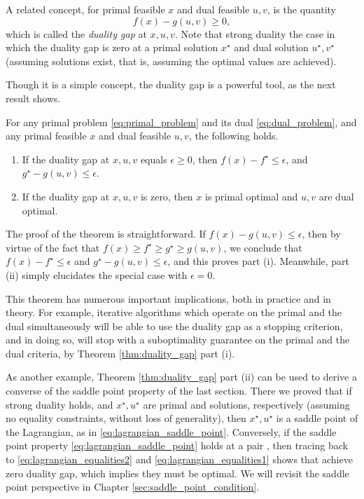 A related concept, for primal feasible $x$ and dual feasible $u,v$, is the
quantity  
\begin{equation}
\label{eq:duality_gap}
f(x) - g(u,v) \geq 0,
\end{equation}
which is called the \emph{duality gap} at $x,u,v$. Note that strong duality the
case in which the duality gap is zero at a primal solution $x^\star$ and dual
solution $u^\star, v^\star$ (assuming solutions exist, that is, assuming the
optimal values are achieved).  

Though it is a simple concept, the duality gap is a powerful tool, as the next
result shows.

\begin{Theorem}
\label{thm:duality_gap}
For any primal problem \eqref{eq:primal_problem} and its dual
\eqref{eq:dual_problem}, and any primal feasible $x$ and dual feasible $u,v$,  
the following holds.  

\begin{enumerate}[label=(\roman*)]
\item If the duality gap at $x,u,v$ equals $\epsilon \geq 0$, then $f(x) -
  f^\star \leq \epsilon$, and $g^\star - g(u,v) \leq \epsilon$.  

\item If the duality gap at $x,u,v$ is zero, then $x$ is primal optimal and
  $u,v$ are dual optimal. 
\end{enumerate}
\end{Theorem}

The proof of the theorem is straightforward. If $f(x) - g(u,v) \leq \epsilon$, 
then by virtue of the fact that $f(x) \geq f^\star \geq g^\star \geq g(u,v)$, we
conclude that $f(x) - f^\star \leq \epsilon$ and $g^\star - g(u,v) \leq
\epsilon$, and this proves part (i). Meanwhile, part (ii) simply elucidates the  
special case with $\epsilon = 0$.

This theorem has numerous important implications, both in practice and in 
theory. For example, iterative algorithms which operate on the primal and the
dual simultaneously will be able to use the duality gap as a stopping criterion, 
and in doing so, will stop with a suboptimality guarantee on the primal and the 
dual criteria, by Theorem \ref{thm:duality_gap} part (i).  

As another example, Theorem \ref{thm:duality_gap} part (ii) can be used to
derive a converse of the saddle point property of the last section. There we
proved that if strong duality holds, and $x^\star,u^\star$ are primal and 
solutions, respectively (assuming no equality constraints, without loss of
generality), then $x^\star, u^\star$ is a saddle point of the Lagrangian, as in
\eqref{eq:lagrangian_saddle_point}. Conversely, if the saddle point property 
\eqref{eq:lagrangian_saddle_point} holds at a pair ,
then tracing back to \eqref{eq:lagrangian_equalities2} and
\eqref{eq:lagrangian_equalities1} shows that  achieve
zero duality gap, which implies they must be optimal. We will revisit the saddle
point perspective in Chapter \ref{sec:saddle_point_condition}.   
 
